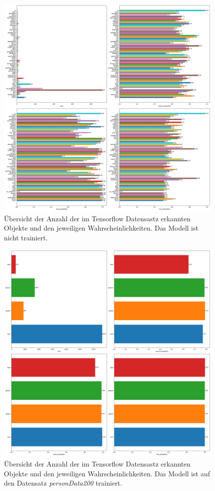 \documentclass[a4paper,12pt,ngerman]{article}
\begin{document}
\newpage
\begin{figure}[ht]
\includegraphics[width=\linewidth]{Analyse_untrainiert}
\centering
\caption{Übersicht der Anzahl der im Tensorflow Datensastz erkannten Objekte und den jeweiligen Wahrscheinlichkeiten. Das Modell ist nicht trainiert.}
\end{figure}

\newpage
\begin{figure}[ht]
\includegraphics[width=\linewidth]{Analyse_trainiert_(PersonData200)}
\centering
\caption{Übersicht der Anzahl der im Tensorflow Datensastz erkannten Objekte und den jeweiligen Wahrscheinlichkeiten. Das Modell ist auf den Datensatz \textit{personData200} trainiert.}
\end{figure}
\end{document}
